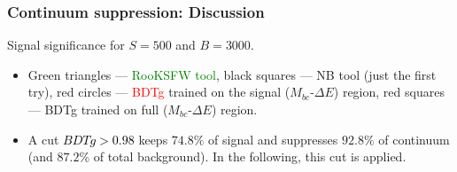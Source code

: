 \documentclass[10 pt,compress,mathserif]{beamer}
\begin{document}
\begin{frame}%
 \frametitle{Continuum suppression: Discussion}
 \begin{small}
 \begin{center}
 
  
  Signal significance for $S = 500$ and $B = 3000$.
 \end{center}
 \begin{itemize}
 \item Green triangles --- \textcolor{green}{RooKSFW tool}, black squares --- NB tool (just the first try), red circles --- \textcolor{red}{BDTg} trained on the signal ($M_{bc}$-$\Delta E$) region, red squares --- BDTg trained on full ($M_{bc}$-$\Delta E$) region.
 \item A cut \textcolor{black}{$BDTg>0.98$} keeps $74.8\%$ of signal and suppresses $92.8\%$ of continuum (and $87.2\%$ of total background). In the following, this cut is applied.
\end{itemize}
\end{small}
\end{frame}
\end{document}
